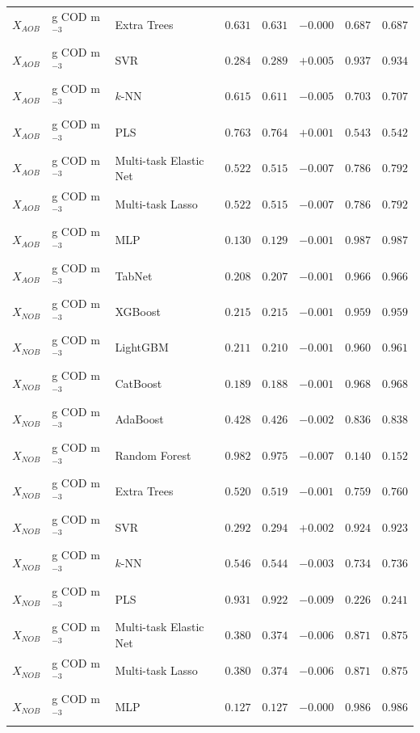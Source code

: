 \begin{longtable}{llp{3.1cm}rrrrr}
$X_{AOB}$ & g COD m$^{-3}$ & Extra Trees & $0.631$ & $0.631$ & $-0.000$ & $0.687$ & $0.687$ \\
$X_{AOB}$ & g COD m$^{-3}$ & SVR & $0.284$ & $0.289$ & $+0.005$ & $0.937$ & $0.934$ \\
$X_{AOB}$ & g COD m$^{-3}$ & $k$-NN & $0.615$ & $0.611$ & $-0.005$ & $0.703$ & $0.707$ \\
$X_{AOB}$ & g COD m$^{-3}$ & PLS & $0.763$ & $0.764$ & $+0.001$ & $0.543$ & $0.542$ \\
$X_{AOB}$ & g COD m$^{-3}$ & Multi-task Elastic Net & $0.522$ & $0.515$ & $-0.007$ & $0.786$ & $0.792$ \\
$X_{AOB}$ & g COD m$^{-3}$ & Multi-task Lasso & $0.522$ & $0.515$ & $-0.007$ & $0.786$ & $0.792$ \\
$X_{AOB}$ & g COD m$^{-3}$ & MLP & $0.130$ & $0.129$ & $-0.001$ & $0.987$ & $0.987$ \\
$X_{AOB}$ & g COD m$^{-3}$ & TabNet & $0.208$ & $0.207$ & $-0.001$ & $0.966$ & $0.966$ \\
$X_{NOB}$ & g COD m$^{-3}$ & XGBoost & $0.215$ & $0.215$ & $-0.001$ & $0.959$ & $0.959$ \\
$X_{NOB}$ & g COD m$^{-3}$ & LightGBM & $0.211$ & $0.210$ & $-0.001$ & $0.960$ & $0.961$ \\
$X_{NOB}$ & g COD m$^{-3}$ & CatBoost & $0.189$ & $0.188$ & $-0.001$ & $0.968$ & $0.968$ \\
$X_{NOB}$ & g COD m$^{-3}$ & AdaBoost & $0.428$ & $0.426$ & $-0.002$ & $0.836$ & $0.838$ \\
$X_{NOB}$ & g COD m$^{-3}$ & Random Forest & $0.982$ & $0.975$ & $-0.007$ & $0.140$ & $0.152$ \\
$X_{NOB}$ & g COD m$^{-3}$ & Extra Trees & $0.520$ & $0.519$ & $-0.001$ & $0.759$ & $0.760$ \\
$X_{NOB}$ & g COD m$^{-3}$ & SVR & $0.292$ & $0.294$ & $+0.002$ & $0.924$ & $0.923$ \\
$X_{NOB}$ & g COD m$^{-3}$ & $k$-NN & $0.546$ & $0.544$ & $-0.003$ & $0.734$ & $0.736$ \\
$X_{NOB}$ & g COD m$^{-3}$ & PLS & $0.931$ & $0.922$ & $-0.009$ & $0.226$ & $0.241$ \\
$X_{NOB}$ & g COD m$^{-3}$ & Multi-task Elastic Net & $0.380$ & $0.374$ & $-0.006$ & $0.871$ & $0.875$ \\
$X_{NOB}$ & g COD m$^{-3}$ & Multi-task Lasso & $0.380$ & $0.374$ & $-0.006$ & $0.871$ & $0.875$ \\
$X_{NOB}$ & g COD m$^{-3}$ & MLP & $0.127$ & $0.127$ & $-0.000$ & $0.986$ & $0.986$ \\

\end{longtable}
